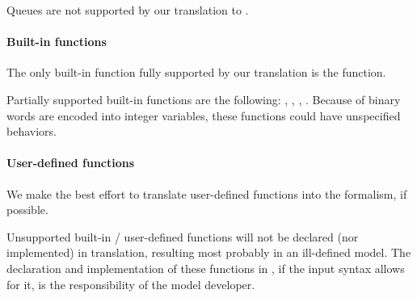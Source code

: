 Queues are not supported by our translation to \uppaal{}.


\paragraph{Built-in functions}

The only \imitator{} built-in function fully supported by our translation is the  function.

Partially supported \imitator{} built-in functions are the following: , , , .
Because of binary words are encoded into integer variables, these functions could have unspecified behaviors.

\paragraph{User-defined functions}

We make the best effort to translate user-defined functions into the \uppaal{} formalism, if possible.

\begin{becareful}
	Unsupported \imitator{} built-in / user-defined functions will not be declared (nor implemented) in \uppaal{} translation, resulting most probably in an ill-defined \uppaal{} model.
	The declaration and implementation of these functions in \uppaal{}, if the \uppaal{} input syntax allows for it, is the responsibility of the model developer.
\end{becareful}

